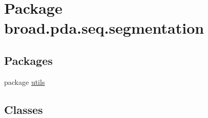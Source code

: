 \hypertarget{namespacebroad_1_1pda_1_1seq_1_1segmentation}{\section{Package broad.\+pda.\+seq.\+segmentation}
\label{namespacebroad_1_1pda_1_1seq_1_1segmentation}
}
\subsection*{Packages}
\begin{DoxyCompactItemize}
\item 
package \hyperlink{namespacebroad_1_1pda_1_1seq_1_1segmentation_1_1utils}{utils}
\end{DoxyCompactItemize}
\subsection*{Classes}
